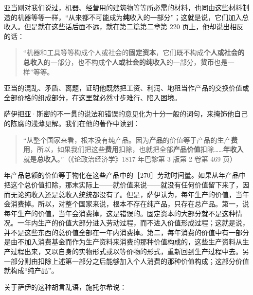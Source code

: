 亚当刚对我们说过，机器、经营用的建筑物等等所必需的材料，也同由这些材料制造的机器等等一样，“从来都不可能成为\textbf{纯}收入的一部分”；这就是说，它们加入总收入。但是就在这些话后面不远，就在第二篇第二章第 220 页上，他却说出相反的话：

\begin{quote}“机器和工具等等构成个人或社会的\textbf{固定资本}，它们既不构成\textbf{个人或社会的总收入}的一部分，也不构成\textbf{个人或社会的纯收入}的一部分，\textbf{货币}也是一样”等等。\end{quote}

亚当的混乱、矛盾、离题，证明他既然把工资、利润、地租当作产品的交换价值或全部价格的组成部分，在这里就必然寸步难行、陷入困境。


萨伊把亚·斯密的不一贯的说法和错误的意见化为十分一般的词句，来掩饰他自己的陈腐的浅薄见解。我们在他的著作中读到：

\begin{quote}“从整个国家来看，根本没有纯产品。因为\textbf{产品}的价值等于产品的生产\textbf{费用}，所以，如果我们把这些\textbf{费用}扣除，也就把全部\textbf{产品价值}扣除……\textbf{年收入}就是\textbf{总收入}。”（《论政治经济学》1817 年巴黎第 3 版第 2 卷第 469 页）\end{quote}

年产品总额的价值等于物化在这些产品中的［270］劳动时间量。如果从年产品中把这个总价值扣除，那末实际上——就价值来说——就没有任何价值留下来了，因而无论纯收入还是总收入统统都没有了。但是，萨伊认为，每年生产的价值，当年会消费掉。所以，对整个国家来说，根本不存在纯产品，只存在总产品。第一，说每年生产的价值，当年会消费掉，这是错误的。固定资本的大部分就不是这种情况。一年内生产的价值大部分进入劳动过程，而不进入价值形成过程；这就是说，并不是这些东西的总价值全部在一年内消费掉。第二，每年消费的价值中有一部分是由不加入消费基金而作为生产资料来消费的那种价值构成的，这些生产资料从生产过程出来，又以自身的实物形式或以等价物的形式，重新回到生产过程中去。另一部分则由扣除上述第一部分之后能够加入个人消费的那种价值构成；这部分价值就构成“纯产品”。

关于萨伊的这种胡言乱语，施托尔希说：

